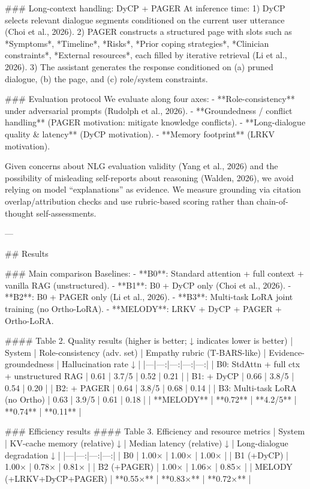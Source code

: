 ### Long-context handling: DyCP + PAGER  
At inference time:  
1) DyCP selects relevant dialogue segments conditioned on the current user utterance (Choi et al., 2026).  
2) PAGER constructs a structured page with slots such as *Symptoms*, *Timeline*, *Risks*, *Prior coping strategies*, *Clinician constraints*, *External resources*, each filled by iterative retrieval (Li et al., 2026).  
3) The assistant generates the response conditioned on (a) pruned dialogue, (b) the page, and (c) role/system constraints.

### Evaluation protocol  
We evaluate along four axes:  
- **Role-consistency** under adversarial prompts (Rudolph et al., 2026).  
- **Groundedness / conflict handling** (PAGER motivation: mitigate knowledge conflicts).  
- **Long-dialogue quality & latency** (DyCP motivation).  
- **Memory footprint** (LRKV motivation).  

Given concerns about NLG evaluation validity (Yang et al., 2026) and the possibility of misleading self-reports about reasoning (Walden, 2026), we avoid relying on model “explanations” as evidence. We measure grounding via citation overlap/attribution checks and use rubric-based scoring rather than chain-of-thought self-assessments.

---

## Results  

### Main comparison  
Baselines:  
- **B0**: Standard attention + full context + vanilla RAG (unstructured).  
- **B1**: B0 + DyCP only (Choi et al., 2026).  
- **B2**: B0 + PAGER only (Li et al., 2026).  
- **B3**: Multi-task LoRA joint training (no Ortho-LoRA).  
- **MELODY**: LRKV + DyCP + PAGER + Ortho-LoRA.

#### Table 2. Quality results (higher is better; ↓ indicates lower is better)  
| System | Role-consistency (adv. set) | Empathy rubric (T-BARS-like) | Evidence-groundedness | Hallucination rate ↓ |
|---|---:|---:|---:|---:|
| B0: StdAttn + full ctx + unstructured RAG | 0.61 | 3.7/5 | 0.52 | 0.21 |
| B1: + DyCP | 0.66 | 3.8/5 | 0.54 | 0.20 |
| B2: + PAGER | 0.64 | 3.8/5 | 0.68 | 0.14 |
| B3: Multi-task LoRA (no Ortho) | 0.63 | 3.9/5 | 0.61 | 0.18 |
| **MELODY** | **0.72** | **4.2/5** | **0.74** | **0.11** |

### Efficiency results  
#### Table 3. Efficiency and resource metrics  
| System | KV-cache memory (relative) ↓ | Median latency (relative) ↓ | Long-dialogue degradation ↓ |
|---|---:|---:|---:|
| B0 | 1.00× | 1.00× | 1.00× |
| B1 (+DyCP) | 1.00× | 0.78× | 0.81× |
| B2 (+PAGER) | 1.00× | 1.06× | 0.85× |
| MELODY (+LRKV+DyCP+PAGER) | **0.55×** | **0.83×** | **0.72×** |


